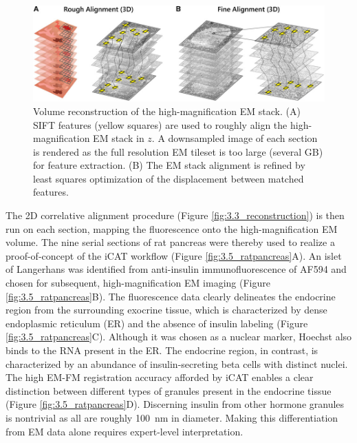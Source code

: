 \begin{figure}[!tb]
    \centering
    \includegraphics[width=\linewidth]{chapter-3/figures_JPEG_LQ/fig3-4_3Dalign.jpg}
    \caption{Volume reconstruction of the high-magnification EM stack.
    (A) SIFT features (yellow squares) are used to roughly align the high-magnification EM stack in $z$. A downsampled image of each section is rendered as the full resolution EM tileset is too large (several GB) for feature extraction.
    (B) The EM stack alignment is refined by least squares optimization of the displacement between matched features.}
    \label{fig:3.4_3Dalign}
\end{figure}

The 2D correlative alignment procedure (Figure \ref{fig:3.3_reconstruction}) is then run on each section, mapping the fluorescence onto the high-magnification EM volume. The nine serial sections of rat pancreas were thereby used to realize a proof-of-concept of the iCAT workflow (Figure \ref{fig:3.5_ratpancreas}A). An islet of Langerhans was identified from anti-insulin immunofluorescence of AF594 and chosen for subsequent, high-magnification EM imaging (Figure \ref{fig:3.5_ratpancreas}B). The fluorescence data clearly delineates the endocrine region from the surrounding exocrine tissue, which is characterized by dense endoplasmic reticulum (ER) and the absence of insulin labeling (Figure \ref{fig:3.5_ratpancreas}C). Although it was chosen as a nuclear marker, Hoechst also binds to the RNA present in the ER. The endocrine region, in contrast, is characterized by an abundance of insulin-secreting beta cells with distinct nuclei. The high EM-FM registration accuracy afforded by iCAT enables a clear distinction between different types of granules present in the endocrine tissue (Figure \ref{fig:3.5_ratpancreas}D). Discerning insulin from other hormone granules is nontrivial as all are roughly \SI{100}{\nano\meter} in diameter. Making this differentiation from EM data alone requires expert-level interpretation.


